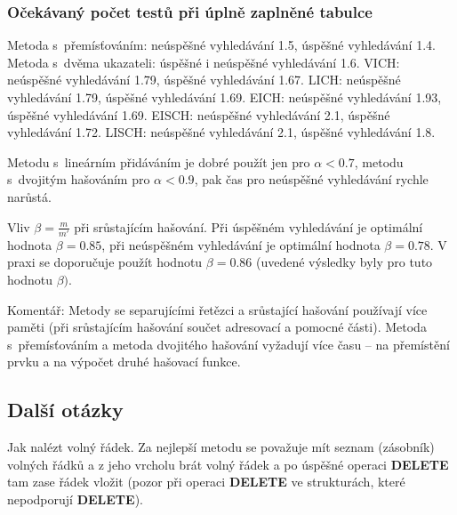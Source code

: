 \documentclass[a4paper,12pt]{article}
\begin{document}
\subsubsection{Očekávaný počet testů při úplně zaplněné 
tabulce}

\phantom{---}Metoda s~přemísťováním: neúspěšné vyhledávání 1.5, úspěšné 
vyhledávání 1.4.\newline 
\phantom{---}Metoda s~dvěma ukazateli: úspěšné i neúspěšné vyhledávání  1.6.\newline 
\phantom{---}VICH: neúspěšné vyhledávání 1.79, úspěšné vyhledávání 
1.67.\newline 
\phantom{---}LICH: neúspěšné vyhledávání 1.79, úspěšné vyhledávání 
1.69.\newline 
\phantom{---}EICH: neúspěšné vyhledávání 1.93, úspěšné vyhledávání 
1.69.\newline 
\phantom{---}EISCH: neúspěšné vyhledávání 2.1, úspěšné vyhledávání 
1.72.\newline 
\phantom{---}LISCH: neúspěšné vyhledávání 2.1, úspěšné vyhledávání 
1.8.

Metodu s~lineárním přidáváním je dobré použít jen pro 
$\alpha <0.7$, metodu s~dvojitým hašováním pro $\alpha 
<0.9$, pak 
čas pro neúspěšné vyhledávání rychle narůstá.

Vliv $\beta =\frac m{m'}$ při srůstajícím hašování.\newline 
Při 
úspěšném vy\-hledávání je optimální hodnota $
\beta =0.85$, při 
neúspěšném vy\-hledávání je optimální hodnota $
\beta =0.78$. 
V praxi se doporučuje použít hodnotu $\beta =0.86$ (uvedené 
výsledky byly pro tuto hodnotu $\beta ).$

Komentář: Metody se separujícími řetězci a 
srůstající hašování používají více paměti (při 
srůstajícím hašování součet adresovací a 
pomocné části). Metoda s~přemísťováním a metoda 
dvojitého hašování vyžadují více času -- na přemístění 
prvku a na výpočet druhé hašovací funkce.

\subsection{Další otázky}

Jak nalézt volný řádek.\newline 
Za nejlepší metodu se považuje mít seznam (zásobník) 
volných řádků a z jeho vrcholu brát volný řádek 
a po úspěšné operaci {\bf DELETE} tam zase řádek vložit 
(pozor při operaci {\bf DELETE} ve strukturách, které 
nepodporují {\bf DELETE}).
\end{document}
